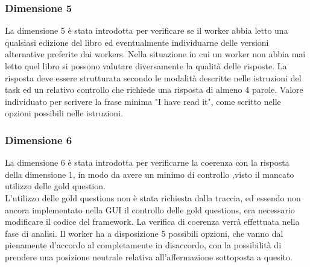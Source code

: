 \documentclass[a4paper,11pt]{report}
\begin{document}
\subsubsection{Dimensione 5}
La dimensione 5 è stata introdotta per verificare se il worker abbia letto una qualsiasi edizione del libro ed eventualmente individuarne delle versioni alternative preferite dai workers. Nella situazione in cui un worker non abbia mai letto quel libro si possono valutare diversamente la qualità delle risposte.   
La risposta deve essere strutturata secondo le modalità descritte nelle istruzioni del task ed un relativo controllo che richiede una risposta di almeno 4 parole. Valore individuato per scrivere la frase minima "I have read it", come scritto nelle opzioni possibili nelle istruzioni.
\subsubsection{Dimensione 6}
La dimensione 6 è stata introdotta per verificarne la coerenza con la risposta della dimensione 1, in modo da avere un minimo di controllo ,visto il mancato utilizzo delle gold question.\\
L'utilizzo delle gold questions non è stata richiesta dalla traccia, ed essendo non ancora implementato nella GUI il controllo delle gold questions, era necessario modificare il codice del framework. La verifica di coerenza verrà effettuata nella fase di analisi.
Il worker ha a disposizione 5 possibili opzioni, che vanno dal pienamente d'accordo al completamente in disaccordo, con la possibilità di prendere una posizione neutrale relativa all'affermazione sottoposta a quesito.
\end{document}
